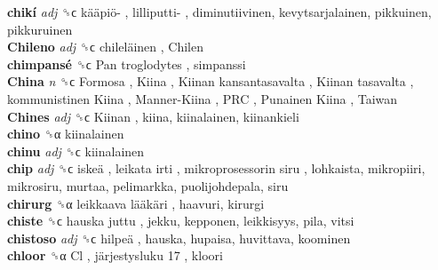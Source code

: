 \textbf{chikí} \emph{adj}  ␝ϲ   kääpiö- ,  lilliputti- , diminutiivinen, kevytsarjalainen, pikkuinen, pikkuruinen  \\
\textbf{Chileno} \emph{adj}  ␝ϲ   chileläinen ,  Chilen   \\
\textbf{chimpansé} ␝ϲ   Pan troglodytes , simpanssi  \\
\textbf{China} \emph{n}  ␝ϲ   Formosa ,  Kiina ,  Kiinan kansantasavalta ,  Kiinan tasavalta ,  kommunistinen Kiina ,  Manner-Kiina ,  PRC ,  Punainen Kiina ,  Taiwan   \\
\textbf{Chines} \emph{adj}  ␝ϲ   Kiinan , kiina, kiinalainen, kiinankieli  \\
\textbf{chino} ␝α  kiinalainen  \\
\textbf{chinu} \emph{adj}  ␝ϲ  kiinalainen  \\
\textbf{chip} \emph{adj}  ␝ϲ   iskeä ,  leikata irti ,  mikroprosessorin siru , lohkaista, mikropiiri, mikrosiru, murtaa, pelimarkka, puolijohdepala, siru  \\
\textbf{chirurg} ␝α   leikkaava lääkäri , haavuri, kirurgi  \\
\textbf{chiste} ␝ϲ   hauska juttu , jekku, kepponen, leikkisyys, pila, vitsi  \\
\textbf{chistoso} \emph{adj}  ␝ϲ   hilpeä , hauska, hupaisa, huvittava, koominen  \\
\textbf{chloor} ␝α   Cl ,  järjestysluku 17 , kloori  \\
